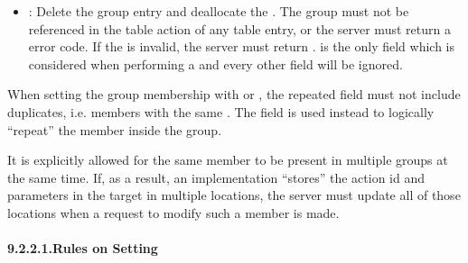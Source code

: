 \documentclass[11pt]{article}
\begin{document}
{\begin{itemize}[noitemsep,topsep=\mdcompacttopsep]
\item{}: Delete the group entry and deallocate the . The group must
not be referenced in the table action of any table entry, or the server must
return a  error code. If the  is invalid, the
server must return .  is the only field which is
considered when performing a  and every other field will be ignored.%
\end{itemize}%

\noindent{}When setting the group membership with  or , the 
repeated field must not include duplicates, i.e. members with the same
. The  field is used instead to logically \textquotedblleft{}repeat\textquotedblright{} the member
inside the group.%

It is explicitly allowed for the same member to be present in multiple groups at
the same time. If, as a result, an implementation \textquotedblleft{}stores\textquotedblright{} the action id and
parameters in the target in multiple locations, the server must update all of
those locations when a request to modify such a member is made.%

\paragraph{9.2.2.1.\hspace*{0.5em}Rules on Setting }\label{sec-max-size-rules}%

}
\end{document}
